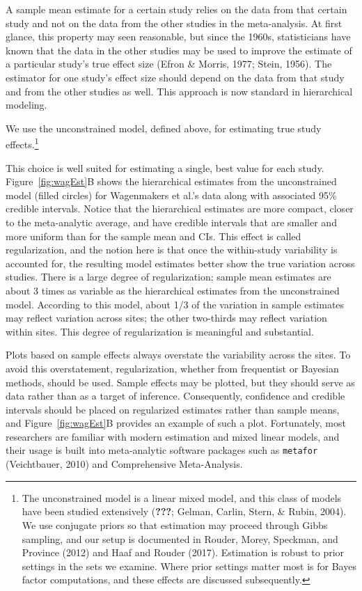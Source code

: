 \documentclass[english,man]{apa6}
\theoremstyle{definition}
\theoremstyle{definition}
\theoremstyle{definition}
\theoremstyle{remark}
\begin{document}
A sample mean estimate for a certain study relies on the data from that
certain study and not on the data from the other studies in the
meta-analysis. At first glance, this property may seen reasonable, but
since the 1960s, statisticians have known that the data in the other
studies may be used to improve the estimate of a particular study's true
effect size (Efron \& Morris, 1977; Stein, 1956). The estimator for one
study's effect size should depend on the data from that study and from
the other studies as well. This approach is now standard in hierarchical
modeling.

We use the unconstrained model, defined above, for estimating true study
effects.\footnote{The unconstrained model is a linear mixed model, and
  this class of models have been studied extensively ({\textbf{???}};
  Gelman, Carlin, Stern, \& Rubin, 2004). We use conjugate priors so
  that estimation may proceed through Gibbs sampling, and our setup is
  documented in Rouder, Morey, Speckman, and Province (2012) and Haaf
  and Rouder (2017). Estimation is robust to prior settings in the sets
  we examine. Where prior settings matter most is for Bayes factor
  computations, and these effects are discussed subsequently.}

This choice is well suited for estimating a single, best value for each
study. Figure~\ref{fig:wagEst}B shows the hierarchical estimates from
the unconstrained model (filled circles) for Wagenmakers et al.'s data
along with associated 95\% credible intervals. Notice that the
hierarchical estimates are more compact, closer to the meta-analytic
average, and have credible intervals that are smaller and more uniform
than for the sample mean and CIs. This effect is called regularization,
and the notion here is that once the within-study variability is
accounted for, the resulting model estimates better show the true
variation across studies. There is a large degree of regularization;
sample mean estimates are about 3 times as variable as the hierarchical
estimates from the unconstrained model. According to this model, about
1/3 of the variation in sample estimates may reflect variation across
sites; the other two-thirds may reflect variation within sites. This
degree of regularization is meaningful and substantial.

Plots based on sample effects always overstate the variability across
the sites. To avoid this overstatement, regularization, whether from
frequentist or Bayesian methods, should be used. Sample effects may be
plotted, but they should serve as data rather than as a target of
inference. Consequently, confidence and credible intervals should be
placed on regularized estimates rather than sample means, and
Figure~\ref{fig:wagEst}B provides an example of such a plot.
Fortunately, most researchers are familiar with modern estimation and
mixed linear models, and their usage is built into meta-analytic
software packages such as \texttt{metafor} (Veichtbauer, 2010) and
Comprehensive Meta-Analysis.
\end{document}
